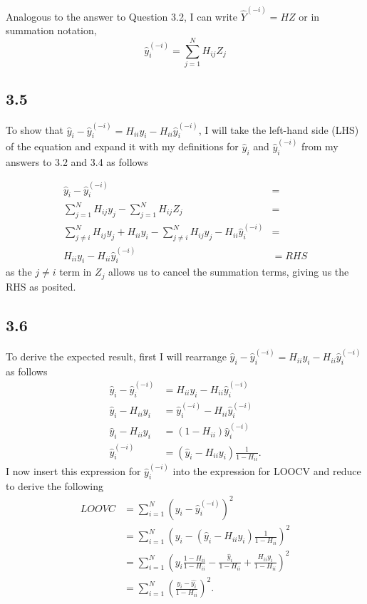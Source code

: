 \documentclass[12pt]{amsart}
\begin{document}
Analogous to the answer to Question 3.2, I can write $\hat{Y}^{(-i)} = HZ$ or in summation notation,
\begin{equation}
\hat{y}_i^{(-i)} = \sum_{j = 1}^N H_{ij}Z_j
\end{equation}

\subsection*{3.5}

To show that $\hat{y}_i - \hat{y}_i^{(-i)} = H_{ii}y_i - H_{ii}\hat{y}_i^{(-i)} $, I will take the left-hand side (LHS) of the equation and expand it with my definitions for $\hat{y}_i $ and $\hat{y}_i^{(-i)}$ from my answers to 3.2 and 3.4 as follows

\begin{equation}
\begin{split}
\hat{y}_i - \hat{y}_i^{(-i)}  & = \\
\sum_{j = 1}^N H_{ij}y_j - \sum_{j = 1}^N H_{ij}Z_j & = \\
\sum_{j \neq i}^N H_{ij}y_j + H_{ii}y_i - \sum_{j \neq i}^N H_{ij}y_j - H_{ii}\hat{y}_i^{(-i)} & = \\
H_{ii}y_i - H_{ii}\hat{y}_i^{(-i)} & = RHS
\end{split}
\end{equation}
as the $j \neq i$ term in $Z_j$ allows us to cancel the summation terms, giving us the RHS as posited.

\subsection*{3.6}

To derive the expected result, first I will rearrange $\hat{y}_i - \hat{y}_i^{(-i)} = H_{ii}y_i - H_{ii}\hat{y}_i^{(-i)}$ as follows
\begin{equation}
\begin{split}
\hat{y}_i - \hat{y}_i^{(-i)} & = H_{ii}y_i - H_{ii}\hat{y}_i^{(-i)}  \\
\hat{y}_i - H_{ii}y_i & =  \hat{y}_i^{(-i)} - H_{ii}\hat{y}_i^{(-i)} \\
\hat{y}_i - H_{ii}y_i & =  (1 - H_{ii})\hat{y}_i^{(-i)} \\
\hat{y}_i^{(-i)} & = (\hat{y}_i - H_{ii}y_i) \frac{1}{1 - H_{ii}}.
\end{split}
\end{equation} 
I now insert this expression for $\hat{y}_i^{(-i)}$ into the expression for LOOCV and reduce to derive the following
\begin{equation}
\begin{split}
LOOVC & = \sum_{i = 1}^N (y_i - \hat{y}_i^{(-i)})^2 \\
& = \sum_{i = 1}^N \left( y_i -  (\hat{y}_i - H_{ii}y_i) \frac{1}{1 - H_{ii}} \right)^2 \\
& = \sum_{i = 1}^N \left( y_i\frac{1 - H_{ii}}{1 - H_{ii}} -  \frac{\hat{y}_i}{1 - H_{ii}}  + \frac{H_{ii}y_i}{1 - H_{ii}}  \right)^2 \\
& = \sum_{i = 1}^N \left( \frac{y_i - \hat{y_i}}{1 - H_{ii}} \right)^2.
\end{split}
\end{equation}
\end{document}
